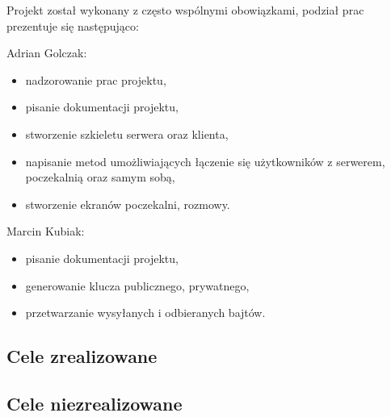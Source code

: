 Projekt został wykonany z często wspólnymi obowiązkami, podział prac prezentuje się następująco:

\noindent Adrian Golczak: 
\begin{itemize}
	\item nadzorowanie prac projektu,
	\item pisanie dokumentacji projektu,
	\item stworzenie szkieletu serwera oraz klienta,
	\item napisanie metod umożliwiających łączenie się użytkowników z serwerem, poczekalnią oraz samym sobą,
	\item stworzenie ekranów poczekalni, rozmowy.
\end{itemize}
Marcin Kubiak:
\begin{itemize}
	\item pisanie dokumentacji projektu,
	\item generowanie klucza publicznego, prywatnego,
	\item przetwarzanie wysyłanych i odbieranych bajtów.	
\end{itemize}

\subsection{Cele zrealizowane}
\subsection{Cele niezrealizowane}
